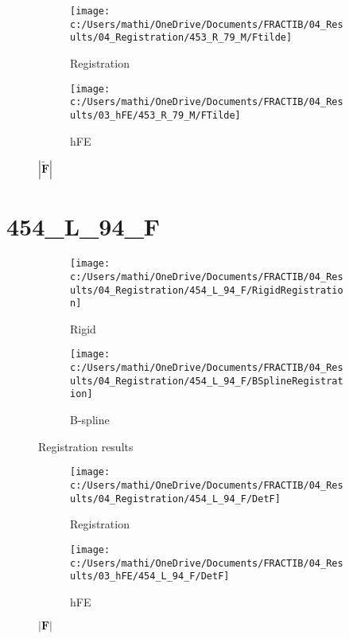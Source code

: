 \documentclass{article}%
\begin{document}
%


\begin{figure}[h!]%
\begin{subfigure}[b]{0.5\linewidth}%
\texttt{[image: c:/Users/mathi/OneDrive/Documents/FRACTIB/04\_Results/04\_Registration/453\_R\_79\_M/Ftilde]}%
\caption{Registration}%
\end{subfigure}%
\begin{subfigure}[b]{0.5\linewidth}%
\texttt{[image: c:/Users/mathi/OneDrive/Documents/FRACTIB/04\_Results/03\_hFE/453\_R\_79\_M/FTilde]}%
\caption{hFE}%
\end{subfigure}%
\caption{$|\widetilde{\mathbf{F}}|$}%
\end{figure}

%
\newpage%
\section*{454\_L\_94\_F}%
\label{sec:454L94F}%


\begin{figure}[h!]%
\begin{subfigure}[b]{0.5\linewidth}%
\texttt{[image: c:/Users/mathi/OneDrive/Documents/FRACTIB/04\_Results/04\_Registration/454\_L\_94\_F/RigidRegistration]}%
\caption{Rigid}%
\end{subfigure}%
\begin{subfigure}[b]{0.5\linewidth}%
\texttt{[image: c:/Users/mathi/OneDrive/Documents/FRACTIB/04\_Results/04\_Registration/454\_L\_94\_F/BSplineRegistration]}%
\caption{B{-}spline}%
\end{subfigure}%
\caption{Registration results}%
\end{figure}

%


\begin{figure}[h!]%
\begin{subfigure}[b]{0.5\linewidth}%
\texttt{[image: c:/Users/mathi/OneDrive/Documents/FRACTIB/04\_Results/04\_Registration/454\_L\_94\_F/DetF]}%
\caption{Registration}%
\end{subfigure}%
\begin{subfigure}[b]{0.5\linewidth}%
\texttt{[image: c:/Users/mathi/OneDrive/Documents/FRACTIB/04\_Results/03\_hFE/454\_L\_94\_F/DetF]}%
\caption{hFE}%
\end{subfigure}%
\caption{$|\mathbf{F}|$}%
\end{figure}

%
\end{document}
